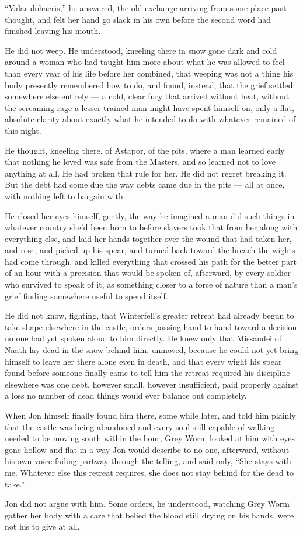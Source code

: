 “Valar dohaeris,” he answered, the old exchange arriving from some place past thought, and felt her hand go slack in his own before the second word had finished leaving his mouth.

\sceneBreak

He did not weep. He understood, kneeling there in snow gone dark and cold around a woman who had taught him more about what he was allowed to feel than every year of his life before her combined, that weeping was not a thing his body presently remembered how to do, and found, instead, that the grief settled somewhere else entirely — a cold, clear fury that arrived without heat, without the screaming rage a lesser-trained man might have spent himself on, only a flat, absolute clarity about exactly what he intended to do with whatever remained of this night.

He thought, kneeling there, of Astapor, of the pits, where a man learned early that nothing he loved was safe from the Masters, and so learned not to love anything at all. He had broken that rule for her. He did not regret breaking it. But the debt had come due the way debts came due in the pits — all at once, with nothing left to bargain with.

He closed her eyes himself, gently, the way he imagined a man did such things in whatever country she’d been born to before slavers took that from her along with everything else, and laid her hands together over the wound that had taken her, and rose, and picked up his spear, and turned back toward the breach the wights had come through, and killed everything that crossed his path for the better part of an hour with a precision that would be spoken of, afterward, by every soldier who survived to speak of it, as something closer to a force of nature than a man’s grief finding somewhere useful to spend itself.

He did not know, fighting, that Winterfell’s greater retreat had already begun to take shape elsewhere in the castle, orders passing hand to hand toward a decision no one had yet spoken aloud to him directly. He knew only that Missandei of Naath lay dead in the snow behind him, unmoved, because he could not yet bring himself to leave her there alone even in death, and that every wight his spear found before someone finally came to tell him the retreat required his discipline elsewhere was one debt, however small, however insufficient, paid properly against a loss no number of dead things would ever balance out completely.

When Jon himself finally found him there, some while later, and told him plainly that the castle was being abandoned and every soul still capable of walking needed to be moving south within the hour, Grey Worm looked at him with eyes gone hollow and flat in a way Jon would describe to no one, afterward, without his own voice failing partway through the telling, and said only, “She stays with me. Whatever else this retreat requires, she does not stay behind for the dead to take.”

Jon did not argue with him. Some orders, he understood, watching Grey Worm gather her body with a care that belied the blood still drying on his hands, were not his to give at all.